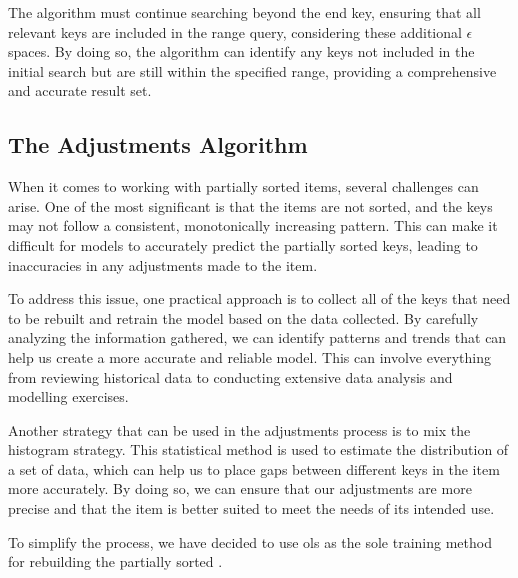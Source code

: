The algorithm must continue searching beyond the end key, ensuring that all relevant keys are included in the range query, considering these additional $\epsilon$ spaces. By doing so, the algorithm can identify any keys not included in the initial search but are still within the specified range, providing a comprehensive and accurate result set.


\subsection{The Adjustments Algorithm}
When it comes to working with partially sorted items, several challenges can arise. One of the most significant is that the items are not sorted, and the keys may not follow a consistent, monotonically increasing pattern. This can make it difficult for models to accurately predict the partially sorted keys, leading to inaccuracies in any adjustments made to the item.

To address this issue, one practical approach is to collect all of the keys that need to be rebuilt and retrain the model based on the data collected. By carefully analyzing the information gathered, we can identify patterns and trends that can help us create a more accurate and reliable model. This can involve everything from reviewing historical data to conducting extensive data analysis and modelling exercises.

Another strategy that can be used in the adjustments process is to mix the histogram strategy. This statistical method is used to estimate the distribution of a set of data, which can help us to place gaps between different keys in the item more accurately. By doing so, we can ensure that our adjustments are more precise and that the item is better suited to meet the needs of its intended use.

To simplify the process, we have decided to use \acrfull{ols} as the sole training method for rebuilding the partially sorted \learnindex.

